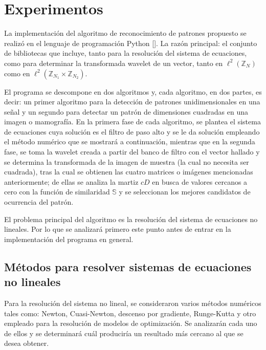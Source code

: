 \chapter{Experimentos}\label{chapter:implementation}

\par La implementaci\'on del algoritmo de reconocimiento de patrones propuesto se realiz\'o en el lenguaje de programaci\'on Python [\cite{22}]. La raz\'on principal: el conjunto de bibliotecas que incluye, tanto para la resoluci\'on del sistema de ecuaciones, como para determinar la transformada wavelet de un vector, tanto en $\ell^2(\mathbb{Z}_N)$ como en $\ell^2(\mathbb{Z}_{N_1}\times\mathbb{Z}_{N_2})$.

\par El programa se descompone en dos algoritmos y, cada algoritmo, en dos partes, es decir: un primer algoritmo para la detecci\'on de patrones unidimensionales en una se\~nal y un segundo para detectar un patr\'on de dimensiones cuadradas en una imagen o mamograf\'ia. En la primera fase de cada algoritmo, se plantea el sistema de ecuaciones cuya soluci\'on es el filtro de paso alto y se le da soluci\'on empleando el m\'etodo num\'erico que se mostrar\'a a continuaci\'on, mientras que en la segunda fase, se toma la wavelet creada a partir del banco de filtro con el vector hallado y se determina la transformada de la imagen de muestra (la cual no necesita ser cuadrada), tras la cual se obtienen las cuatro matrices o im\'agenes mencionadas anteriormente; de ellas se analiza la martiz $cD$ en busca de valores cercanos a cero con la funci\'on de similaridad $\mathbb{S}$ y se seleccionan los mejores candidatos de ocurrencia del patr\'on.\\

\par El problema principal del algoritmo es la resoluci\'on del sistema de ecuaciones no lineales. Por lo que se analizar\'a primero este punto antes de entrar en la implementaci\'on del programa en general.\\

\section{M\'etodos para resolver sistemas de ecuaciones no lineales}

\par Para la resoluci\'on del sistema no lineal, se consideraron varios m\'etodos num\'ericos tales como: Newton, Cuasi-Newton, descenso por gradiente, Runge-Kutta y otro empleado para la resoluci\'on de modelos de optimizaci\'on. Se analizar\'an cada uno de ellos y se determinar\'a cu\'al producir\'ia un resultado m\'as cercano al que se desea obtener.

